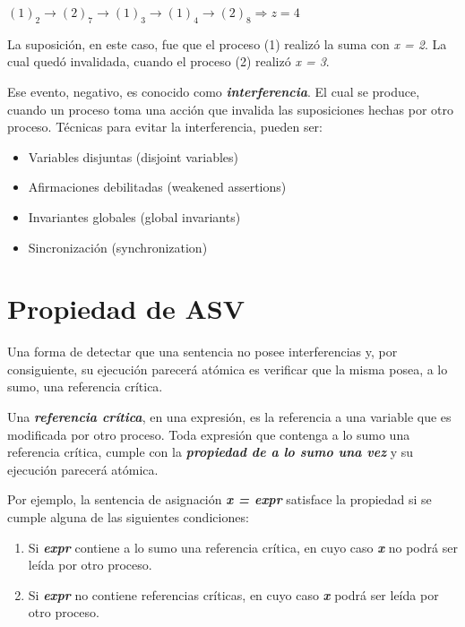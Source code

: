 \documentclass[a4paper, 10pt]{report}
\begin{document}
\centerline{$(1)_2 \rightarrow (2)_7 \rightarrow (1)_3 \rightarrow (1)_4 \rightarrow (2)_8 \Rightarrow z = 4$}

La suposición, en este caso, fue que el proceso (1) realizó la suma con \emph{x = 2}. La cual quedó invalidada, cuando el proceso (2) realizó \emph{x = 3}. 

Ese evento, negativo, es conocido como \textbf{\emph{interferencia}}. El cual se produce, cuando un proceso toma una acción que invalida las suposiciones hechas por otro proceso. Técnicas para evitar la interferencia, pueden ser:

\begin{itemize}
	\item Variables disjuntas (disjoint variables)
	\item Afirmaciones debilitadas (weakened assertions)
	\item Invariantes globales (global invariants)
	\item Sincronización (synchronization)
\end{itemize}

\section{Propiedad de ASV}

Una forma de detectar que una sentencia no posee interferencias y, por consiguiente, su ejecución parecerá atómica es verificar que la misma posea, a lo sumo, una referencia crítica.

Una \textbf{\emph{referencia crítica}}, en una expresión, es la referencia a una variable que es modificada por otro proceso. Toda expresión que contenga a lo sumo una referencia crítica, cumple con la \textbf{\emph{propiedad de a lo sumo una vez}} y su ejecución parecerá atómica.

Por ejemplo, la sentencia de asignación \textbf{\emph{x = expr}} satisface la propiedad si se cumple alguna de las siguientes condiciones:

\begin{enumerate}
	\item Si \textbf{\emph{expr}} contiene a lo sumo una referencia crítica, en cuyo caso \textbf{\emph{x}} no podrá ser leída por otro proceso.
	\item Si \textbf{\emph{expr}} no contiene referencias críticas, en cuyo caso \textbf{\emph{x}} podrá ser leída por otro proceso.
\end{enumerate}
\end{document}
